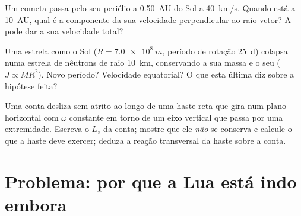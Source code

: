 \begin{exercise}[$\star\star\star$]\label{exo:b1:angular-momentum:10}
Um cometa passa pelo seu periélio a \qty{0.50}{AU} do Sol a
\qty{40}{km/s}. Quando está a \qty{10}{AU}, qual é a componente da
sua velocidade perpendicular ao raio vetor? A  pode
dar a sua velocidade total?
\end{exercise}

\begin{exercise}[$\star\star\star$]\label{exo:b1:angular-momentum:11}
Uma estrela como o Sol ($R = \qty{7.0e8}{m}$, período de rotação \qty{25}{d})
colapsa numa estrela de nêutrons de raio \qty{10}{km}, conservando a sua massa
e o seu  ($J \propto MR^2$). Novo período? Velocidade equatorial?
O que esta última diz sobre a hipótese feita?
\end{exercise}

\begin{exercise}[$\star\star\star$]\label{exo:b1:angular-momentum:12}
Uma conta desliza sem atrito ao longo de uma haste reta que gira num
plano horizontal com $\omega$ constante em torno de um eixo vertical que passa por uma
extremidade. Escreva o $L_z$ da conta; mostre que ele \emph{não} se conserva e
calcule o  que a haste deve exercer; deduza a reação transversal
da haste sobre a conta.
\end{exercise}

\section{Problema: por que a Lua está indo embora}

